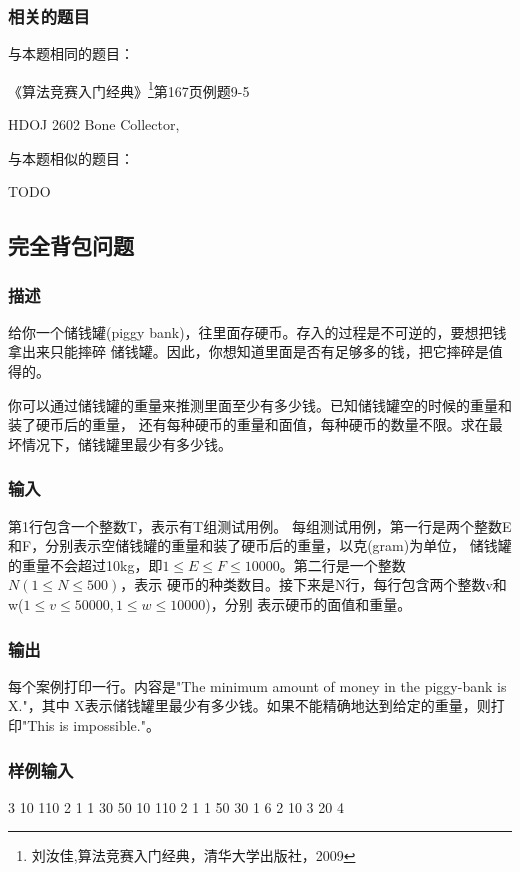 \subsubsection{相关的题目}
与本题相同的题目：
\begindot
\item 《算法竞赛入门经典》\footnote{刘汝佳,算法竞赛入门经典，清华大学出版社，2009}第167页例题9-5
\item  HDOJ 2602 Bone Collector, 
\myenddot

与本题相似的题目：
\begindot
\item  TODO
\myenddot

\subsection{完全背包问题}
\label{sec:ukp}

\subsubsection{描述}
给你一个储钱罐(piggy bank)，往里面存硬币。存入的过程是不可逆的，要想把钱拿出来只能摔碎
储钱罐。因此，你想知道里面是否有足够多的钱，把它摔碎是值得的。

你可以通过储钱罐的重量来推测里面至少有多少钱。已知储钱罐空的时候的重量和装了硬币后的重量，
还有每种硬币的重量和面值，每种硬币的数量不限。求在最坏情况下，储钱罐里最少有多少钱。

\subsubsection{输入}
第1行包含一个整数T，表示有T组测试用例。
每组测试用例，第一行是两个整数E和F，分别表示空储钱罐的重量和装了硬币后的重量，以克(gram)为单位，
储钱罐的重量不会超过10kg，即$1 \leq E \leq F \leq 10000$。第二行是一个整数$N(1 \leq N \leq 500)$，表示
硬币的种类数目。接下来是N行，每行包含两个整数v和w($1 \leq v \leq 50000, 1 \leq w \leq 10000$)，分别
表示硬币的面值和重量。

\subsubsection{输出}
每个案例打印一行。内容是"The minimum amount of money in the piggy-bank is X."，其中
X表示储钱罐里最少有多少钱。如果不能精确地达到给定的重量，则打印"This is impossible."。

\subsubsection{样例输入}
\begin{Code}
3
10 110
2
1 1
30 50
10 110
2
1 1
50 30
1 6
2
10 3
20 4
\end{Code}

